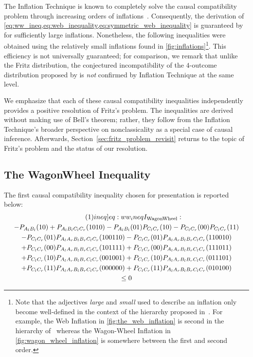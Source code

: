 \documentclass[aps, 10pt, english, twoside, pra, nofootinbib, tightenlines, longbibliography, superscriptaddress]{revtex4-1}
\begin{document}
    The Inflation Technique is known to completely solve the causal compatibility problem through increasing orders of inflations~\cite{Navascues_2017}. Consequently, the derivation of \cref{eq:ww_ineq,eq:web_inequality,eq:symmetric_web_inequality} is guaranteed by~\cite{Navascues_2017} for sufficiently large inflations. Nonetheless, the following inequalities were obtained using the relatively small inflations found in \cref{fig:inflations}\footnote{Note that the adjectives \textit{large} and \textit{small} used to describe an inflation only become well-defined in the context of the hierarchy proposed in~\cite{Navascues_2017}. For example, the Web Inflation in \cref{fig:the_web_inflation} is second in the hierarchy of~\cite{Navascues_2017} whereas the Wagon-Wheel Inflation in \cref{fig:wagon_wheel_inflation} is somewhere between the first and second order.}. This efficiency is not universally guaranteed; for comparison, we remark that unlike the Fritz distribution, the conjectured incompatibility of the $4$-outcome distribution proposed by \cite{Gisin_2017} is \textit{not} confirmed by Inflation Technique at the same level.

    We emphasize that each of these causal compatibility inequalities independently provides a positive resolution of Fritz's problem. The inequalities are derived without making use of Bell's theorem; rather, they follow from the Inflation Technique's broader perspective on nonclassicality as a special case of causal inference. Afterwards, Section~\ref{sec:fritz_problem_revisit} returns to the topic of Fritz's problem and the status of our resolution.

    \subsection{The WagonWheel Inequality}
    The first causal compatibility inequality chosen for presentation is reported below:
    \begin{equation*}
    \begin{gathered}
        \eq\label[ineq]{eq:ww_ineq}
        I\tsb{WagonWheel} : \\
        -P_{A_{l}B_{l}}(10)
        +P_{A_{l}B_{l}C_{l}C_{r}}(1010)
        -P_{A_{l}B_{l}}(01) P_{C_{l}C_{r}}(10)
        -P_{C_{l}C_{r}}(00) P_{C_{l}C_{r}}(11) \\
        -P_{C_{l}C_{r}}(01) P_{A_{l}A_{r}B_{l}B_{r}C_{l}C_{r}}(100110)
        -P_{C_{l}C_{r}}(01) P_{A_{l}A_{r}B_{l}B_{r}C_{l}C_{r}}(110010) \\
        +P_{C_{l}C_{r}}(00) P_{A_{l}A_{r}B_{l}B_{r}C_{l}C_{r}}(101111)
        +P_{C_{l}C_{r}}(00) P_{A_{l}A_{r}B_{l}B_{r}C_{l}C_{r}}(111011) \\
        +P_{C_{l}C_{r}}(10) P_{A_{l}A_{r}B_{l}B_{r}C_{l}C_{r}}(001001)
        +P_{C_{l}C_{r}}(10) P_{A_{l}A_{r}B_{l}B_{r}C_{l}C_{r}}(011101) \\
        +P_{C_{l}C_{r}}(11) P_{A_{l}A_{r}B_{l}B_{r}C_{l}C_{r}}(000000)
        +P_{C_{l}C_{r}}(11) P_{A_{l}A_{r}B_{l}B_{r}C_{l}C_{r}}(010100) \\
        \leq 0
    \end{gathered}
    \end{equation*}
\end{document}
